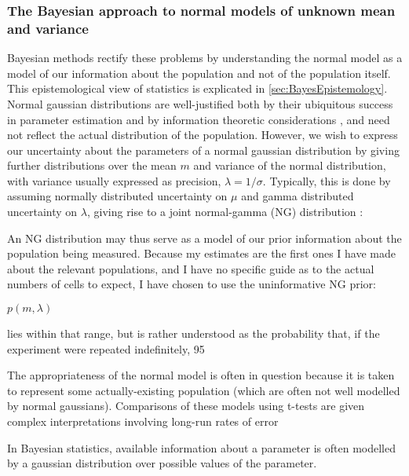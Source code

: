 \subsubsection{The Bayesian approach to normal models of unknown mean and variance}
Bayesian methods rectify these problems by understanding the normal model as a model of our information about the population and not of the population itself. This epistemological view of statistics is explicated in \autoref{sec:BayesEpistemology}. Normal gaussian distributions are well-justified both by their ubiquitous success in parameter estimation and by information theoretic considerations \cite{Jaynes2003}, and need not reflect the actual distribution of the population. However, we wish to express our uncertainty about the parameters of a normal gaussian distribution by giving further distributions over the mean $m$ and variance of the normal distribution, with variance usually expressed as precision, $\lambda = 1/\sigma$. Typically, this is done by  assuming normally distributed uncertainty on $\mu$ and gamma distributed uncertainty on $\lambda$, giving rise to a joint normal-gamma (NG) distribution \cite{Bernardo2000}:

An NG distribution may thus serve as a model of our prior information about the population being measured. Because my estimates are the first ones I have made about the relevant populations, and I have no specific guide as to the actual numbers of cells to expect, I have chosen to use the uninformative NG prior:

$p(m,\lambda)$


lies within that range, but is rather understood as the probability that, if the experiment were repeated indefinitely, 95

The appropriateness of the normal model is often in question because it is taken to represent some actually-existing population (which are often not well modelled by normal gaussians). Comparisons of these models using t-tests are given complex interpretations involving long-run rates of error

In Bayesian statistics, available information about a parameter is often modelled by a gaussian distribution over possible values of the parameter. 
